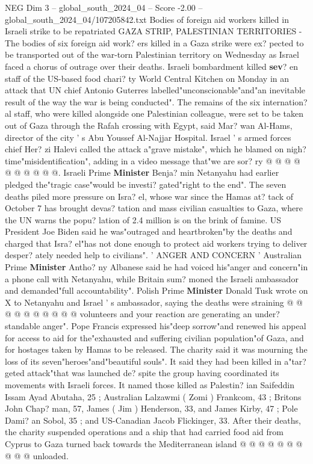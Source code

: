 \begin{textsample}{NEG Dim 3 – global\_south\_2024\_04 – Score -2.00 – global\_south\_2024\_04/107205842.txt}  \label{ex:f3_neg_241}
Bodies of foreign aid workers killed in Israeli strike to be repatriated GAZA STRIP, PALESTINIAN TERRITORIES - The bodies of six foreign aid work? ers killed in a Gaza strike were ex? pected to be transported out of the war-torn Palestinian territory on Wednesday as Israel faced a chorus of outrage over their deaths.
Israeli bombardment killed \textbf{sev}? en staff of the US-based food chari? ty World Central Kitchen on Monday in an attack that UN chief Antonio Guterres labelled"unconscionable"and"an inevitable result of the way the war is being conducted".
The remains of the six internation? al staff, who were killed alongside one Palestinian colleague, were set to be taken out of Gaza through the Rafah crossing with Egypt, said Mar? wan Al-Hams, director of the city ' s Abu Youssef Al-Najjar Hospital.
Israel ' s armed forces chief Her? zi Halevi called the attack a"grave mistake", which he blamed on nigh? time"misidentification", adding in a video message that"we are sor? ry @ @ @ @ @ @ @ @ @ @.
Israeli Prime \textbf{Minister} Benja? min Netanyahu had earlier pledged the"tragic case"would be investi? gated"right to the end".
The seven deaths piled more pressure on Isra? el, whose war since the Hamas at? tack of October 7 has brought devas? tation and mass civilian casualties to Gaza, where the UN warns the popu? lation of 2.4 million is on the brink of famine.
US President Joe Biden said he was"outraged and heartbroken"by the deaths and charged that Isra? el"has not done enough to protect aid workers trying to deliver desper? ately needed help to civilians". ' ANGER AND CONCERN ' Australian Prime \textbf{Minister} Antho? ny Albanese said he had voiced his"anger and concern"in a phone call with Netanyahu, while Britain sum? moned the Israeli ambassador and demanded"full accountability".
Polish Prime \textbf{Minister} Donald Tusk wrote on X to Netanyahu and Israel ' s ambassador, saying the deaths were straining @ @ @ @ @ @ @ @ @ @ volunteers and your reaction are generating an under? standable anger".
Pope Francis expressed his"deep sorrow"and renewed his appeal for access to aid for the"exhausted and suffering civilian population"of Gaza, and for hostages taken by Hamas to be released.
The charity said it was mourning the loss of its seven"heroes"and"beautiful souls".
It said they had been killed in a"tar? geted attack"that was launched de? spite the group having coordinated its movements with Israeli forces.
It named those killed as Palestin? ian Saifeddin Issam Ayad Abutaha, 25 ; Australian Lalzawmi ( Zomi ) Frankcom, 43 ; Britons John Chap? man, 57, James ( Jim ) Henderson, 33, and James Kirby, 47 ; Pole Dami? an Sobol, 35 ; and US-Canadian Jacob Flickinger, 33.
After their deaths, the charity suspended operations and a ship that had carried food aid from Cyprus to Gaza turned back towards the Mediterranean island @ @ @ @ @ @ @ @ @ @ unloaded.

\end{textsample}
